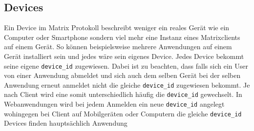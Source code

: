     \subsection{Devices}
    Ein Device im Matrix Protokoll beschreibt weniger ein reales Gerät wie ein Computer oder Smartphone sondern viel mehr eine Instanz eines Matrixclients auf einem Gerät.
    So können beispielsweise mehrere Anwendungen auf einem Gerät installiert sein und jedes wäre sein eigenes Device.
    Jedes Device bekommt seine eigene \texttt{device\_id} zugewiesen.
    Dabei ist zu beachten, dass falls sich ein User von einer Anwendung abmeldet und sich auch dem selben Gerät bei der selben Anwendung erneut anmeldet nicht die gleiche \texttt{device\_id} zugewiesen bekommt.
    Je nach Client wird eine somit unterschiedlich häufig die \texttt{device\_id} gewechselt.
    In Webanwendungen wird bei jedem Anmelden ein neue \texttt{device\_id} angelegt wohingegen bei Client auf Mobilgeräten oder Computern die gleiche \texttt{device\_id}
    Devices finden hauptsächlich Anwendung

    \newpage
